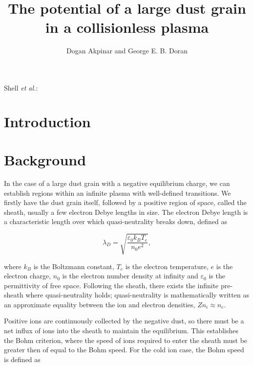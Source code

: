 \documentclass{article}
\begin{document}
\title{The potential of a large dust grain in a collisionless plasma}
\author{Dogan Akpinar and George E. B. Doran}
{Shell \MakeLowercase{\textit{et al.}}:}

\maketitle

\begin{abstract}

\end{abstract}

\section{Introduction}

\section{Background}

In the case of a large dust grain with a negative equilibrium charge, we can establish regions within an infinite plasma with well-defined
transitions. We firstly have the dust grain itself, followed
by a positive region of space, called the sheath, usually a few electron Debye lengths
in size. The electron Debye length is a characteristic length over which quasi-neutrality breaks down, 
defined as

\begin{equation}\label{eq:Debye}
\lambda_D = \sqrt{\frac{\varepsilon_{0} k_{B} T_{e}}{n_{0} e^2}},
\end{equation}

\medskip

\noindent where $k_B$ is the Boltzmann constant, $T_e$ is the electron temperature, $e$ is the 
electron charge, $n_0$ is the electron number density at infinity and $\varepsilon_{0}$ is the
permittivity of free space. Following the sheath, there exists the infinite pre-sheath where quasi-neutrality holds;
quasi-neutrality is mathematically written as an approximate equality between the ion and electron
densities, $Zn_i \approx n_e$.

\medskip

Positive ions are continuously collected by the negative dust, so there must be
a net influx of ions into the sheath to maintain the equilibrium. This establishes the Bohm
criterion, where the speed of ions required to enter the sheath must be 
greater then of equal to the Bohm speed. For the cold ion case, the Bohm speed is defined as
\end{document}
